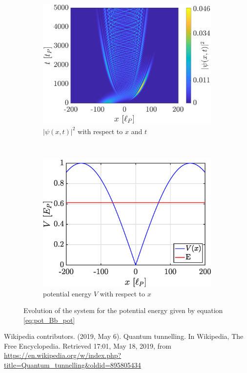 \documentclass[a4paper,12pt,twoside]{article}
\begin{document}
      \begin{figure}[h]
        \centering
        \begin{subfigure}[t]{0.45\textwidth}
          \includegraphics[width=\textwidth]{graphs/v_pot_Bb_evo.eps}
          \caption{$|\psi(x, t)|^2$ with respect to $x$ and $t$}
          \label{fig:v_pot_Bb_evo}
        \end{subfigure}
        ~
        \begin{subfigure}[t]{0.45\textwidth}
          \includegraphics[width=\textwidth]{graphs/v_pot_Bb_pot.eps}
          \caption{potential energy $V$ with respect to $x$}
          \label{fig:v_pot_Bb_pot}
        \end{subfigure}
        \caption{Evolution of the system for the potential energy given by equation \eqref{eq:pot_Bb_pot}}
        \label{fig:v_pot_Bb}
      \end{figure}




\newpage
\begin{thebibliography}{99}
   Wikipedia contributors. (2019, May 6). Quantum tunnelling. In Wikipedia, The Free Encyclopedia. Retrieved 17:01, May 18, 2019, from \url{https://en.wikipedia.org/w/index.php?title=Quantum_tunnelling&oldid=895805434}
\end{thebibliography}
\end{document}
